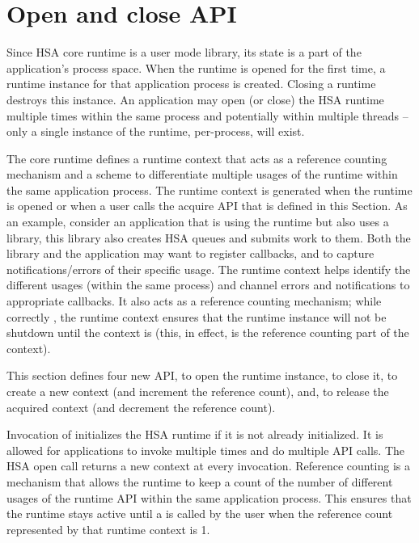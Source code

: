 \begin{DIFnomarkup}
\hypertarget{init}{}\section{Open and close
API}\label{init}
\end{DIFnomarkup}

Since HSA core runtime is a user mode library, its state is a part
of the application's process space. When the runtime is opened for
the first time, a runtime instance for that application process is
created. Closing a runtime destroys this instance. An application
may open (or close) the HSA runtime multiple times within the same
process and potentially within multiple threads -- only a
single instance of the runtime, per-process, will exist.

The core runtime defines a runtime context that acts as a reference
counting mechanism and a scheme to differentiate multiple usages of
the runtime within the same application process. The runtime context
is generated when the runtime is opened or when a
user calls the acquire API that is defined in this Section. As an
example, consider an application that is using the runtime but also
uses a library, this library also creates HSA queues and submits
work to them. Both the library and the application may want to register
callbacks, and to capture notifications/errors of their specific
usage. The runtime context helps identify the different usages (within
the same process) and channel errors and notifications to
appropriate callbacks. It also acts as a reference counting
mechanism; while correctly , the runtime context
ensures that the runtime instance will not be shutdown until the
context is  (this, in effect, is the reference
counting part of the context).

This section defines four new API,  to open the
runtime instance,  to close it,
 to create a new context (and increment
the reference count), and,  to release
the acquired context (and decrement the reference count).

Invocation of  initializes the HSA runtime if it is
not already initialized. It is allowed for applications to invoke
 multiple times and do multiple 
API calls. The HSA open call returns a new context at every
invocation.  Reference counting is a mechanism that allows the
runtime to keep a count of the number of different usages of the
runtime API within the same application process. This ensures that
the runtime stays active until a  is called by the
user when the reference count represented by that runtime context is
1.

